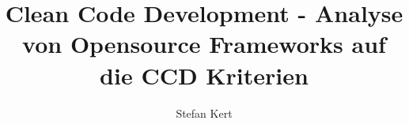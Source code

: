 \documentclass[bachelor,german]{hgbthesis}
\begin{document}
\title{Clean Code Development - Analyse von Opensource Frameworks auf die CCD Kriterien}
\author{Stefan Kert}
\frontmatter
\maketitle
\tableofcontents

		
			

\mainmatter 














\appendix

\MakeBibliography
\end{document}
